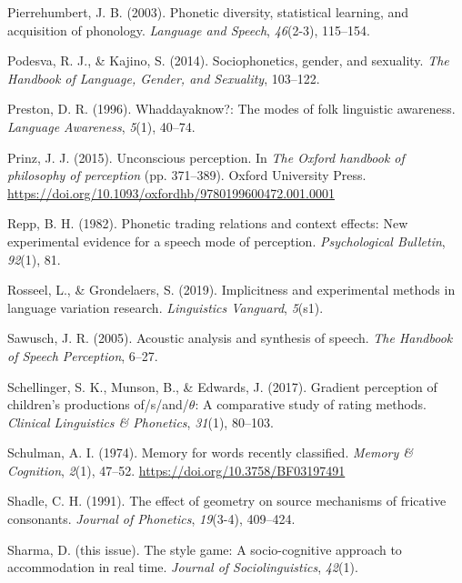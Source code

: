 \documentclass[
  letterpaper,
  DIV=11,
  numbers=noendperiod]{scrartcl}
\newlength{\cslhangindent}
\newenvironment{CSLReferences}[2] %
 {\begin{list}{}{%
  \setlength{\itemindent}{0pt}
  \setlength{\leftmargin}{0pt}
  \setlength{\parsep}{0pt}
  \ifodd #1
   \setlength{\leftmargin}{\cslhangindent}
   \setlength{\itemindent}{-1\cslhangindent}
  \fi
  \setlength{\itemsep}{#2\baselineskip}}}
 {\end{list}}
\begin{document}
\begin{CSLReferences}{1}{0}
Pierrehumbert, J. B. (2003). Phonetic diversity, statistical learning,
and acquisition of phonology. \emph{Language and Speech},
\emph{46}(2-3), 115--154.

Podesva, R. J., \& Kajino, S. (2014). Sociophonetics, gender, and
sexuality. \emph{The Handbook of Language, Gender, and Sexuality},
103--122.

Preston, D. R. (1996). Whaddayaknow?: The modes of folk linguistic
awareness. \emph{Language Awareness}, \emph{5}(1), 40--74.

Prinz, J. J. (2015). Unconscious perception. In \emph{The {Oxford}
handbook of philosophy of perception} (pp. 371--389). Oxford University
Press. \url{https://doi.org/10.1093/oxfordhb/9780199600472.001.0001}

Repp, B. H. (1982). Phonetic trading relations and context effects: New
experimental evidence for a speech mode of perception.
\emph{Psychological Bulletin}, \emph{92}(1), 81.

Rosseel, L., \& Grondelaers, S. (2019). Implicitness and experimental
methods in language variation research. \emph{Linguistics Vanguard},
\emph{5}(s1).

Sawusch, J. R. (2005). Acoustic analysis and synthesis of speech.
\emph{The Handbook of Speech Perception}, 6--27.

Schellinger, S. K., Munson, B., \& Edwards, J. (2017). Gradient
perception of children's productions of/s/and/\(\theta\): A comparative
study of rating methods. \emph{Clinical Linguistics \& Phonetics},
\emph{31}(1), 80--103.

Schulman, A. I. (1974). Memory for words recently classified.
\emph{Memory \& Cognition}, \emph{2}(1), 47--52.
\url{https://doi.org/10.3758/BF03197491}

Shadle, C. H. (1991). The effect of geometry on source mechanisms of
fricative consonants. \emph{Journal of Phonetics}, \emph{19}(3-4),
409--424.

Sharma, D. (this issue). The style game: A socio-cognitive approach to
accommodation in real time. \emph{Journal of Sociolinguistics},
\emph{42}(1).


\end{CSLReferences}
\end{document}
